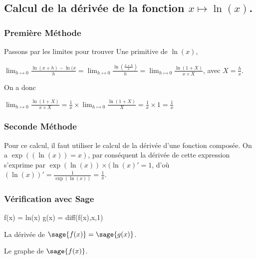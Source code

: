 \documentclass[a4paper,14pt]{extreport} %
\begin{document}
\subsection{Calcul de la dérivée de la fonction $x \mapsto \ln(x) $.}


\subsubsection{Première Méthode}


Passons par les limites pour trouver Une primitive de $\ln(x)$,

$ \lim_{h \mapsto 0} \frac{\ln(x+h) - \ln(x}{h} = \lim_{h \mapsto 0} \frac{\ln(\frac{x+h}{x})}{h}  = \lim_{h \mapsto 0} \frac{ \ln(1+X)}{x\times X}$, avec $X=\frac{h}{x}$.


On a donc 

$\lim_{h \mapsto 0} \frac{\ln(1+X)}{x\times X} = \frac{1}{x} \times \lim_{h \mapsto 0} \frac{\ln(1+X)}{X} = \frac{1}{x} \times 1 = \frac{1}{x}$




\subsubsection{Seconde Méthode}

Pour ce calcul, il faut utiliser le calcul de la dérivée d'une fonction composée. On a $\exp((\ln(x))=x)$, par conséquent la dérivée de cette expression s'exprime par $ \exp(\ln(x)) \times (\ln(x)' = 1$, d'où $(\ln(x))' = \frac{1}{\exp(\ln(x))}  = \frac{1}{x} $.

\subsubsection{Vérification avec Sage}

\begin{sageblock}
    f(x) = ln(x)
    g(x) = diff(f(x),x,1)
\end{sageblock}

La dérivée de $\sage{f(x)} = \sage{g(x)} $.

Le graphe de $\sage{f(x)} $.


\begin{center}
 \\
\end{center}
\end{document}
